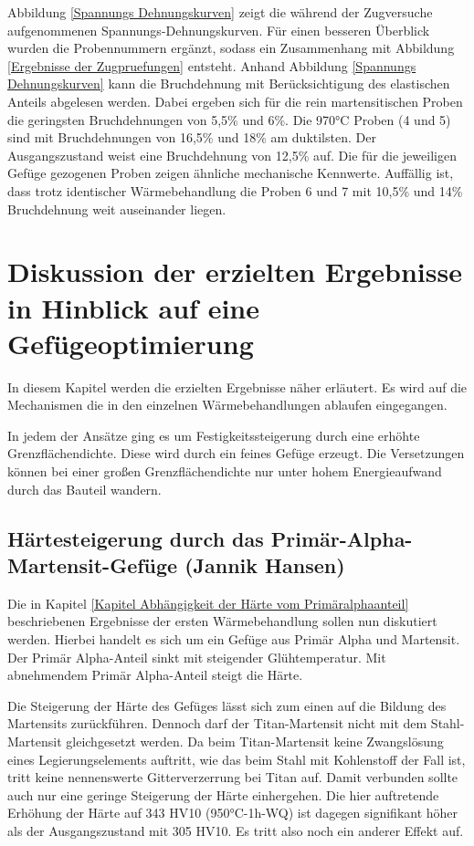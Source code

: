 \documentclass[a4paper, 11pt]{tubsreprt}
\begin{document}
Abbildung \ref{Spannungs Dehnungskurven} zeigt die während der Zugversuche aufgenommenen Spannungs-Dehnungskurven. Für einen besseren Überblick wurden die Probennummern ergänzt, sodass ein Zusammenhang mit Abbildung \ref{Ergebnisse der Zugpruefungen} entsteht. Anhand Abbildung \ref{Spannungs Dehnungskurven} kann die Bruchdehnung mit Berücksichtigung des elastischen Anteils abgelesen werden. Dabei ergeben sich für die rein martensitischen Proben die geringsten Bruchdehnungen  von 5,5\% und 6\%. Die 970°C Proben (4 und 5) sind mit Bruchdehnungen von 16,5\% und 18\% am duktilsten. Der Ausgangszustand weist eine Bruchdehnung von 12,5\% auf. Die für die jeweiligen Gefüge gezogenen Proben zeigen ähnliche mechanische Kennwerte. Auffällig ist, dass trotz identischer Wärmebehandlung die Proben 6 und 7 mit 10,5\% und 14\% Bruchdehnung weit auseinander liegen.

\chapter{Diskussion der erzielten Ergebnisse in Hinblick auf eine Gefügeoptimierung}
In diesem Kapitel werden die erzielten Ergebnisse näher erläutert. Es wird auf die Mechanismen die in den  einzelnen Wärmebehandlungen ablaufen eingegangen.

In jedem der Ansätze ging es um Festigkeitssteigerung durch eine erhöhte Grenzflächendichte. Diese wird durch ein feines Gefüge erzeugt. Die Versetzungen können bei einer großen Grenzflächendichte nur unter hohem Energieaufwand durch das Bauteil wandern. 
\section{Härtesteigerung durch das Primär-Alpha-Martensit-Gefüge (Jannik Hansen)}\label{Kapitel einfluss des Primäralphaanteils}
Die in Kapitel \ref{Kapitel Abhängigkeit der Härte vom Primäralphaanteil} beschriebenen Ergebnisse der ersten Wärmebehandlung sollen nun diskutiert werden. Hierbei handelt es sich um ein Gefüge aus Primär Alpha und Martensit. Der Primär Alpha-Anteil sinkt mit steigender Glühtemperatur. Mit abnehmendem Primär Alpha-Anteil steigt die Härte.


Die Steigerung der Härte des Gefüges lässt sich zum einen auf die Bildung des Martensits zurückführen. Dennoch darf der Titan-Martensit nicht mit dem Stahl-Martensit gleichgesetzt werden. Da beim Titan-Martensit keine Zwangslösung eines Legierungselements auftritt, wie das beim Stahl mit Kohlenstoff der Fall ist, tritt keine nennenswerte Gitterverzerrung bei Titan auf. Damit verbunden sollte auch nur eine geringe Steigerung der Härte einhergehen. Die hier auftretende Erhöhung der Härte auf 343 HV10 (950°C-1h-WQ) ist dagegen signifikant höher als der Ausgangszustand mit 305 HV10. Es tritt also noch ein anderer Effekt auf.
\end{document}
